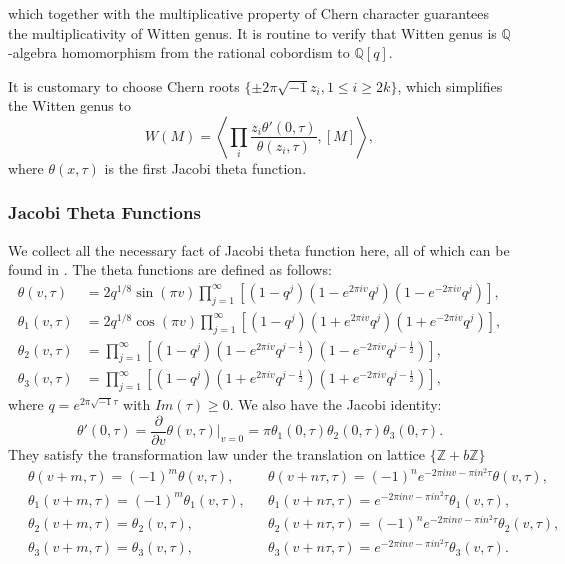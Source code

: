 \documentclass[11pt]{article}
\newcommand{\intg}{\mathbb Z}
\newcommand{\ratl}{\mathbb Q}
\begin{document}
which together with the multiplicative property of Chern character guarantees the multiplicativity of Witten genus. It is routine to verify that Witten genus is $\ratl$-algebra homomorphism from the rational cobordism to $\ratl[q]$.

It is customary to choose Chern roots $\{\pm 2\pi\sqrt{-1}z_i,1\leq i\geq 2k\}$, which simplifies the Witten genus to 
\begin{equation*}
	W(M)=\left\langle\prod_{i}\frac{z_i \theta'(0,\tau)}{\theta(z_i,\tau)},[M]\right\rangle,
\end{equation*}
where $\theta(x,\tau)$ is the first Jacobi theta function.
\subsubsection*{Jacobi Theta Functions}
We collect all the necessary fact of Jacobi theta function here, all of which can be found in \cite{chandrasekharan1985elliptic}. The theta functions are defined as follows:
\begin{equation*}
\begin{aligned}
	\theta (v,\tau ) & =2 q^{1/8} \sin(\pi  v) \prod _{j=1}^{\infty } \left[\left(1-q^j\right) \left(1-e^{2 \pi  i v} q^j\right) \left(1-e^{-2 \pi  i v} q^j\right)\right],\\
	\theta _1(v,\tau )& =2 q^{1/8} \cos(\pi  v) \prod _{j=1}^{\infty } \left[\left(1-q^j\right) \left(1+e^{2 \pi  i v} q^j\right) \left(1+e^{-2 \pi  i v} q^j\right)\right],\\
	\theta _2(v,\tau )&=\prod _{j=1}^{\infty } \left[\left(1-q^j\right) \left(1-e^{2 \pi  i v} q^{j-\frac{1}{2}}\right) \left(1-e^{-2 \pi  i v} q^{j-\frac{1}{2}}\right)\right],\\
	\theta _3(v,\tau )&=\prod _{j=1}^{\infty } \left[\left(1-q^j\right) \left(1+e^{2 \pi  i v} q^{j-\frac{1}{2}}\right) \left(1+e^{-2 \pi  i v} q^{j-\frac{1}{2}}\right)\right],
\end{aligned}
\end{equation*}
where $q=e^{2\pi\sqrt{-1} \tau}$ with $Im(\tau)\geq 0$. We also have the Jacobi identity:
\begin{equation*}
\theta '(0,\tau )=\frac{\partial }{\partial v}\theta (v,\tau )|_{v=0}=\pi\theta_1(0,\tau )\theta _2(0,\tau )\theta _3(0,\tau ).
\end{equation*}
They satisfy the transformation law under the translation on lattice $\{\intg+b\intg\}$
\begin{equation}\label{theta}
\begin{aligned}
\ &\theta (v+m,\tau ) =(-1)^m\theta (v,\tau ),& &\theta (v+n \tau ,\tau )=(-1)^n e^{ -2 \pi  i n v-\pi  i n^2 \tau}\theta (v,\tau ),\\
\ &\theta_1 (v+m,\tau ) =(-1)^m\theta_1 (v,\tau ),& &\theta_1 (v+n \tau ,\tau )= e^{ -2 \pi  i n v-\pi  i n^2 \tau}\theta_1 (v,\tau ),\\
\ &\theta_2 (v+m,\tau ) =\theta_2 (v,\tau ), & &\theta_2 (v+n \tau ,\tau )=(-1)^n e^{ -2 \pi  i n v-\pi  i n^2 \tau}\theta_2 (v,\tau ),\\
\ &\theta_3 (v+m,\tau ) =\theta_3 (v,\tau ),& &\theta_3 (v+n \tau ,\tau )= e^{ -2 \pi  i n v-\pi  i n^2 \tau}\theta_3 (v,\tau ).
\end{aligned}
\end{equation}
\end{document}
